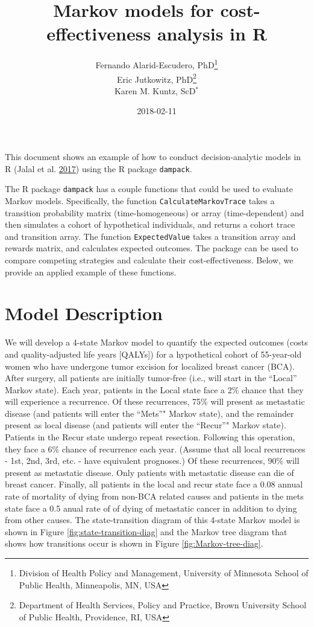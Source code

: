 \documentclass[]{article}
\title{Markov models for cost-effectiveness analysis in R}
\author{Fernando Alarid-Escudero, PhD\footnote{Division of Health Policy and
  Management, University of Minnesota School of Public Health,
  Minneapolis, MN, USA} \\ Eric Jutkowitz, PhD\footnote{Department of Health Services, Policy and
  Practice, Brown University School of Public Health, Providence, RI,
  USA} \\ Karen M. Kuntz, ScD\(^*\)}
\date{2018-02-11}
\theoremstyle{definition}
\theoremstyle{definition}
\theoremstyle{definition}
\theoremstyle{remark}
\begin{document}
\maketitle

{
\setcounter{tocdepth}{4}
\tableofcontents
}
This document shows an example of how to conduct decision-analytic
models in R (Jalal et al. \protect\hyperlink{ref-Jalal2017b}{2017})
using the R package \texttt{dampack}.

The R package \texttt{dampack} has a couple functions that could be used
to evaluate Markov models. Specifically, the function
\texttt{CalculateMarkovTrace} takes a transition probability matrix
(time-homogeneous) or array (time-dependent) and then simulates a cohort
of hypothetical individuals, and returns a cohort trace and transition
array. The function \texttt{ExpectedValue} takes a transition array and
rewards matrix, and calculates expected outcomes. The package can be
used to compare competing strategies and calculate their
cost-effectiveness. Below, we provide an applied example of these
functions.

\section{Model Description}\label{model-description}

We will develop a 4-state Markov model to quantify the expected outcomes
(costs and quality-adjusted life years {[}QALYs{]}) for a hypothetical
cohort of 55-year-old women who have undergone tumor excision for
localized breast cancer (BCA). After surgery, all patients are initially
tumor-free (i.e., will start in the ``Local'' Markov state). Each year,
patients in the Local state face a 2\% chance that they will experience
a recurrence. Of these recurrences, 75\% will present as metastatic
disease (and patients will enter the ``Mets''" Markov state), and the
remainder present as local disease (and patients will enter the
``Recur''" Markov state). Patients in the Recur state undergo repeat
resection. Following this operation, they face a 6\% chance of
recurrence each year. (Assume that all local recurrences - 1st, 2nd,
3rd, etc. - have equivalent prognoses.) Of these recurrences, 90\% will
present as metastatic disease. Only patients with metastatic disease can
die of breast cancer. Finally, all patients in the local and recur state
face a 0.08 annual rate of mortality of dying from non-BCA related
causes and patients in the mets state face a 0.5 anual rate of of dying
of metastatic cancer in addition to dying from other causes. The
state-transition diagram of this 4-state Markov model is shown in Figure
\ref{fig:state-transition-diag} and the Markov tree diagram that shows
how transitions occur is shown in Figure \ref{fig:Markov-tree-diag}.
\end{document}
